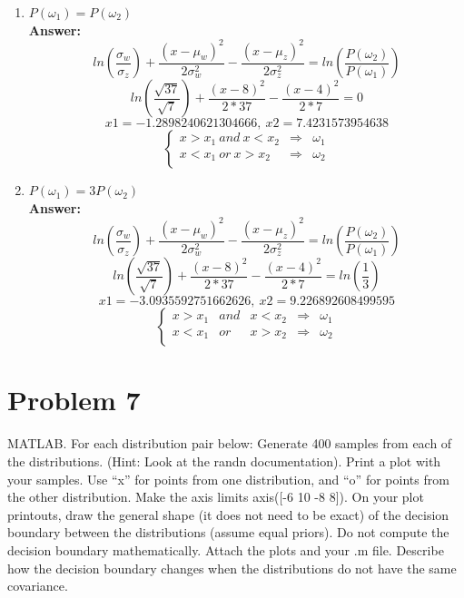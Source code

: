 \documentclass[letterpaper,11pt]{article}
\begin{document}
\begin{enumerate}
\item $P(\omega_1)=P(\omega_2)$\\
\textbf{Answer:}\\
$$ln\left(\frac{\sigma_w}{\sigma_z}\right)+\frac{(x-\mu_w)^2}{2\sigma_w^2}-\frac{(x-\mu_z)^2}{2\sigma_z^2}=ln\left(\frac{P(\omega_2)}{P(\omega_1)}\right)$$
$$ln\left(\frac{\sqrt{37}}{\sqrt{7}}\right)+\frac{(x-8)^2}{2*37}-\frac{(x-4)^2}{2*7}=0$$
$$x1=-1.2898240621304666,~x2=7.4231573954638$$
$$\left\{\begin{array}{rcl}
x>x_1~and~x<x_2 & \Rightarrow & \omega_1 \\
x<x_1~or~x>x_2 & \Rightarrow & \omega_2 \\
\end{array}\right.$$

\item $P(\omega_1)=3P(\omega_2)$\\
\textbf{Answer:}\\
$$ln\left(\frac{\sigma_w}{\sigma_z}\right)+\frac{(x-\mu_w)^2}{2\sigma_w^2}-\frac{(x-\mu_z)^2}{2\sigma_z^2}=ln\left(\frac{P(\omega_2)}{P(\omega_1)}\right)$$
$$ln\left(\frac{\sqrt{37}}{\sqrt{7}}\right)+\frac{(x-8)^2}{2*37}-\frac{(x-4)^2}{2*7}=ln\left(\frac{1}{3}\right)$$
$$x1=-3.0935592751662626,~x2=9.226892608499595$$
$$\left\{\begin{array}{rclcl}
x>x_1 & and & x<x_2 & \Rightarrow & \omega_1 \\
x<x_1 & or & x>x_2 & \Rightarrow & \omega_2 \\
\end{array}\right.$$

\end{enumerate}

\newpage

\section*{Problem 7}

MATLAB. For each distribution pair below: Generate 400 samples from each of
the distributions. (Hint: Look at the randn documentation). Print a plot with
your samples. Use “x” for points from one distribution, and “o” for points from
the other distribution. Make the axis limits axis([-6 10 -8 8]). On your plot
printouts, draw the general shape (it does not need to be exact) of the decision
boundary between the distributions (assume equal priors). Do not compute the
decision boundary mathematically. Attach the plots and your .m file. Describe
how the decision boundary changes when the distributions do not have the same
covariance.
\end{document}
